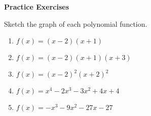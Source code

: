 \textbf{Practice Exercises}

\vspce

Sketch the graph of each polynomial function. 
\begin{enumerate}[label = \arabic*. ]
\item \hspce $f(x) = (x-2)(x+1)$
\item \hspce $f(x) =(x-2)(x+1)(x+3)$
\item \hspce $f(x) =(x-2)^2(x+2)^2$
\item \hspce $f(x) =x^4-2x^3-3x^2+4x+4$
\item \hspce $f(x) =-x^3-9x^2-27x-27$
\end{enumerate} 